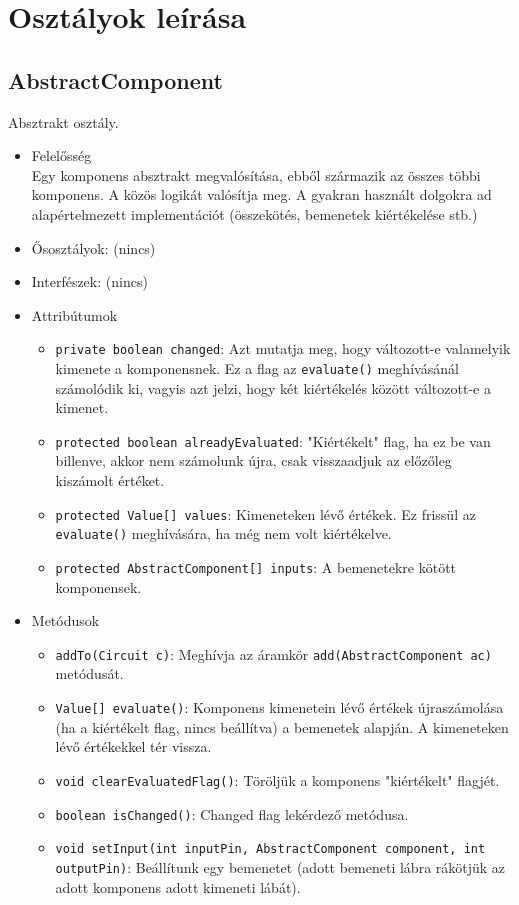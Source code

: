 \section{Osztályok leírása}

\subsection{AbstractComponent}
Absztrakt osztály.
\begin{itemize}
\item Felelősség\\
Egy komponens absztrakt megvalósítása, ebből származik az összes többi  komponens. A közös logikát valósítja meg. A gyakran használt dolgokra  ad alapértelmezett implementációt (összekötés, bemenetek kiértékelése stb.)
\item Ősosztályok: (nincs)
\item Interfészek: (nincs)
\item Attribútumok $\ $
\begin{itemize}
	\item \texttt{private boolean changed}: Azt mutatja meg, hogy változott-e valamelyik kimenete a komponensnek. Ez a flag az \texttt{evaluate()} meghívásánál számolódik ki, vagyis azt jelzi, hogy két kiértékelés között változott-e a kimenet.
	\item \texttt{protected boolean alreadyEvaluated}: "Kiértékelt" flag, ha ez be van billenve, akkor nem számolunk újra, csak visszaadjuk az előzőleg kiszámolt értéket.
	\item \texttt{protected Value[] values}: Kimeneteken lévő értékek. Ez frissül az \texttt{evaluate()} meghívására, ha még nem volt kiértékelve.
	\item \texttt{protected AbstractComponent[] inputs}: A bemenetekre kötött komponensek.
\end{itemize}
\item Metódusok$\ $
\begin{itemize}
	\item \texttt{addTo(Circuit c)}: Meghívja az áramkör \texttt{add(AbstractComponent ac)} metódusát.
	\item \texttt{Value[] evaluate()}: Komponens kimenetein lévő értékek újraszámolása (ha a kiértékelt flag, nincs beállítva) a bemenetek alapján. A kimeneteken lévő értékekkel tér vissza.
	\item \texttt{void clearEvaluatedFlag()}: Töröljük a komponens "kiértékelt" flagjét.
	\item \texttt{boolean isChanged()}: Changed flag lekérdező metódusa.
	\item \raggedright \texttt{void setInput(int inputPin, AbstractComponent component, int outputPin)}: Beállítunk egy bemenetet (adott bemeneti lábra rákötjük az adott komponens adott kimeneti lábát).
\end{itemize}
\end{itemize}


